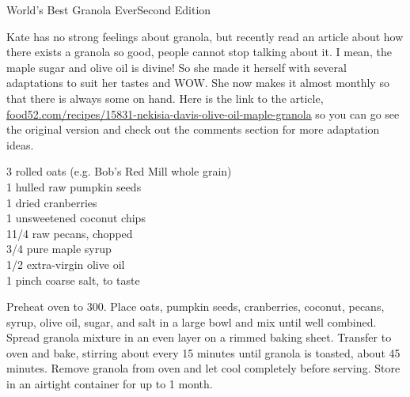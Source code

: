 \begin{entry}{World's Best Granola Ever}{Second Edition}

\begin{open}
 Kate has no strong feelings about granola, but recently read an article
  about how there exists a granola so good, people cannot stop talking about
  it. I mean, the maple sugar and olive oil is divine! So she made it herself
  with several adaptations to suit her tastes and WOW. She now makes it
  almost monthly so that there is always some on hand. Here is the link to the
  article,
  \url{food52.com/recipes/15831-nekisia-davis-olive-oil-maple-granola} so you
  can go see the original version and check out the comments section for more
  adaptation ideas.
\end{open}
\begin{ingredients}
    \SI{3}{\cup} rolled oats (e.g. Bob's Red Mill whole grain)\\
    \SI{1}{\cup} hulled raw pumpkin seeds\\
    \SI{1}{\cup} dried cranberries\\
    \SI{1}{\cup} unsweetened coconut chips\\
    1\SI{1/4}{\cup} raw pecans, chopped\\
    \SI{3/4}{\cup} pure maple syrup\\
    \SI{1/2}{\cup} extra-virgin olive oil\\
    1 pinch coarse salt, to taste
\end{ingredients}
Preheat oven to \SI{300}{\degreeF}. Place oats, pumpkin seeds, cranberries,
coconut, pecans, syrup, olive oil, sugar, and salt in a large bowl and mix
until well combined. Spread granola mixture in an even layer on a rimmed
baking sheet. Transfer to oven and bake, stirring about every 15 minutes until
granola is toasted, about 45 minutes. Remove granola from oven and let cool
completely before serving. Store in an airtight container for up to 1 month.
\end{entry}

